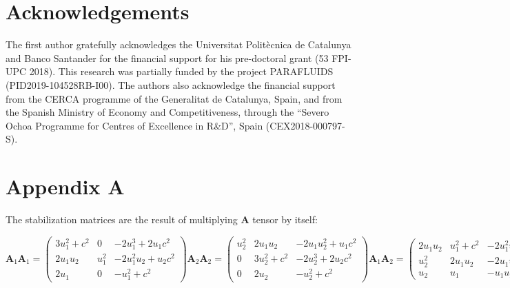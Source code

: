 \documentclass[a4paper,12pt]{elsarticle}
\begin{document}
\section{Acknowledgements}

The first author gratefully acknowledges the Universitat Politècnica de Catalunya and Banco Santander for the financial support for his pre-doctoral grant (53 FPI-UPC 2018).
This research was partially funded by the project PARAFLUIDS (PID2019-104528RB-I00). The authors also acknowledge the financial support from the CERCA programme of the Generalitat de Catalunya, Spain, and from the Spanish Ministry of Economy and Competitiveness, through the “Severo Ochoa Programme for Centres of Excellence in R\&D”, Spain (CEX2018-000797-S).



\section*{Appendix A}

The stabilization matrices are the result of multiplying $\mathbf{A}$ tensor by itself:

\begin{subequations}
\begin{equation}
\mathbf{A}_1\mathbf{A}_1 =
\begin{pmatrix}
3u_1^2 + c^2 & 0  & -2u_1^3 + 2u_1c^2 \\
2u_1u_2  & u_1^2  & -2u_1^2u_2 + u_2c^2 \\
2u_1  & 0   & -u_1^2 + c^2
\end{pmatrix}
\end{equation}
\begin{equation}
    \mathbf{A}_2\mathbf{A}_2 =
\begin{pmatrix}
u_2^2  & 2u_1u_2  & -2u_1u_2^2 + u_1c^2 \\
0    & 3u_2^2 + c^2 & -2u_2^3 + 2u_2c^2 \\
0  & 2u_2  & -u_2^2 + c^2
\end{pmatrix}
\end{equation}
\begin{equation}
\mathbf{A}_1\mathbf{A}_2 =
\begin{pmatrix}
2u_1u_2  & u_1^2 + c^2  & -2u_1^2u_2 \\
u_2^2  & 2u_1u_2  & -2u_1u_2^2 + u_1c^2 \\
u_2  & u_1  & -u_1u_2
\end{pmatrix}
\end{equation}
\begin{equation}
\mathbf{A}_2\mathbf{A}_1 =
\begin{pmatrix}
2u_1u_2  & u_1^2  & -2u_1^2u_2 + u_2c^2 \\
u_2^2 + c^2  & 2u_1u_2  & -2u_1u_2^2 \\
u_2  & u_1  & -u_1u_2
\end{pmatrix}
\end{equation}
\end{subequations}




\end{document}

